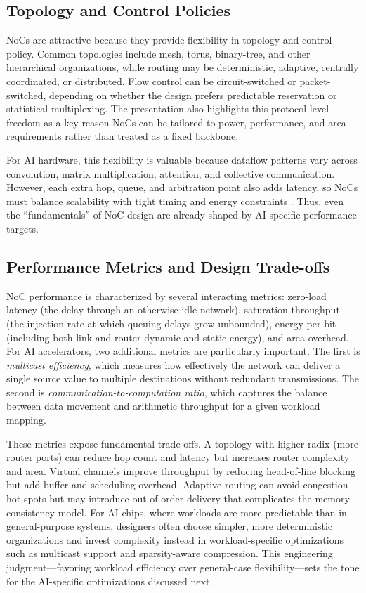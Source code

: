 \subsection{Topology and Control Policies}

NoCs are attractive because they provide flexibility in topology and control policy. Common topologies include mesh, torus, binary-tree, and other hierarchical organizations, while routing may be deterministic, adaptive, centrally coordinated, or distributed. Flow control can be circuit-switched or packet-switched, depending on whether the design prefers predictable reservation or statistical multiplexing. The presentation also highlights this protocol-level freedom as a key reason NoCs can be tailored to power, performance, and area requirements rather than treated as a fixed backbone.

For AI hardware, this flexibility is valuable because dataflow patterns vary across convolution, matrix multiplication, attention, and collective communication. However, each extra hop, queue, and arbitration point also adds latency, so NoCs must balance scalability with tight timing and energy constraints \cite{chen2016eyeriss,chen2019eyerissv2}. Thus, even the ``fundamentals'' of NoC design are already shaped by AI-specific performance targets.

\subsection{Performance Metrics and Design Trade-offs}

NoC performance is characterized by several interacting metrics: zero-load latency (the delay through an otherwise idle network), saturation throughput (the injection rate at which queuing delays grow unbounded), energy per bit (including both link and router dynamic and static energy), and area overhead. For AI accelerators, two additional metrics are particularly important. The first is \emph{multicast efficiency}, which measures how effectively the network can deliver a single source value to multiple destinations without redundant transmissions. The second is \emph{communication-to-computation ratio}, which captures the balance between data movement and arithmetic throughput for a given workload mapping.

These metrics expose fundamental trade-offs. A topology with higher radix (more router ports) can reduce hop count and latency but increases router complexity and area. Virtual channels improve throughput by reducing head-of-line blocking but add buffer and scheduling overhead. Adaptive routing can avoid congestion hot-spots but may introduce out-of-order delivery that complicates the memory consistency model. For AI chips, where workloads are more predictable than in general-purpose systems, designers often choose simpler, more deterministic organizations and invest complexity instead in workload-specific optimizations such as multicast support and sparsity-aware compression. This engineering judgment---favoring workload efficiency over general-case flexibility---sets the tone for the AI-specific optimizations discussed next.

